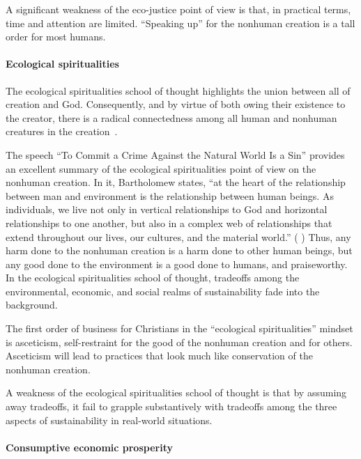 \documentclass[12pt]{article}
\begin{document}
A significant weakness of the eco-justice point of view is that,
in practical terms, time and attention are limited.
``Speaking up'' for the nonhuman creation is a tall order for most humans.


\paragraph{Ecological spiritualities} 
\label{sec:ecological_spiritualities}

The ecological spiritualities school of thought 
highlights the union between all of creation and God.
Consequently, and by virtue of both owing their existence to the creator,
there is a radical connectedness among all human and nonhuman creatures 
in the creation~\autocite[93]{Jenkins:2008}.

The speech ``To Commit a Crime Against the Natural World Is a Sin'' 
\autocite[133-136]{Bartholomew-I-of-Constantinople:2011aa}
provides an excellent summary of the ecological spiritualities point of view
on the nonhuman creation.
In it, Bartholomew states,
``at the heart of the relationship between man and environment 
is the relationship between human beings.
As individuals, we live not only in vertical relationships to God 
and horizontal relationships to one another, but 
also in a complex web of relationships that extend throughout
our lives, our cultures, and the material world.''
(\textcite{Bartholomew-I-of-Constantinople:2011aa} 
\textcite[133--134]{Bartholomew-I-of-Constantinople:2011aa})
Thus, any harm done to the nonhuman creation is a harm done to other human beings, but
any good done to the environment is a good done to humans, 
and praiseworthy. 
In the ecological spiritualities school of thought, 
tradeoffs among the environmental, economic, and social realms of sustainability
fade into the background. 

The first order of business for Christians in the ``ecological spiritualities'' mindset 
is asceticism, self-restraint for the good of the nonhuman creation and for others.
Asceticism will lead to practices that look much like conservation of the nonhuman creation.

A weakness of the ecological spiritualities school of thought
is that by assuming away tradeoffs,
it fail to grapple substantively with tradeoffs
among the three aspects of sustainability
in real-world situations.


\paragraph{Consumptive economic prosperity} 
\label{sec:consumptive_economic_prosperity}
\end{document}
